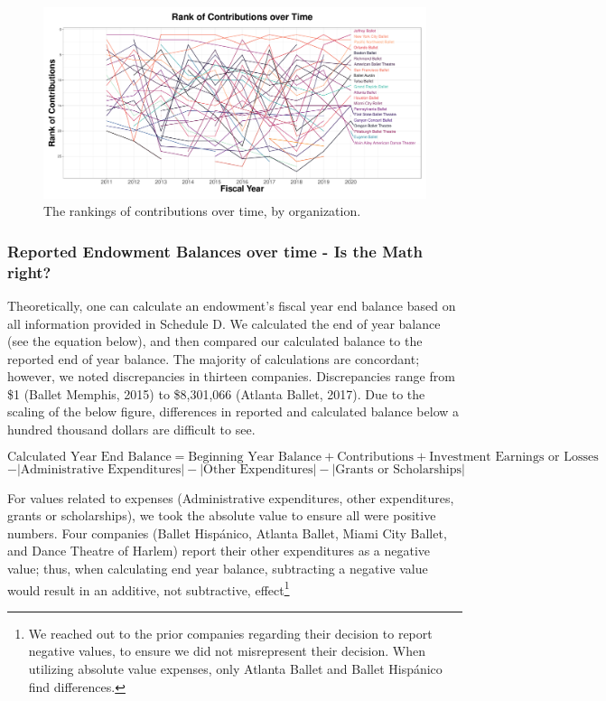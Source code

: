 \documentclass[Dance Data
Project,article,submit,moreauthors,pdftex]{mdpi}
\begin{document}
\begin{figure}[H]
\includegraphics[width=1\linewidth,]{../images/ranking-contributions} \caption{\label{fig:rankings-contributions}The rankings of contributions over time, by organization.}\label{fig:ranking-contributions}
\end{figure}

\hypertarget{reported-endowment-balances-over-time---is-the-math-right}{%
\subsubsection{Reported Endowment Balances over time - Is the Math
right?}\label{reported-endowment-balances-over-time---is-the-math-right}}

Theoretically, one can calculate an endowment's fiscal year end balance
based on all information provided in Schedule D. We calculated the end
of year balance (see the equation below), and then compared our
calculated balance to the reported end of year balance. The majority of
calculations are concordant; however, we noted discrepancies in thirteen
companies. Discrepancies range from \$1 (Ballet Memphis, 2015) to
\$8,301,066 (Atlanta Ballet, 2017). Due to the scaling of the below
figure, differences in reported and calculated balance below a hundred
thousand dollars are difficult to see.

\[\text{Calculated Year End Balance} = \text{Beginning Year Balance} + \text{Contributions} + \text{Investment Earnings or Losses}\]
\[- |\text{Administrative Expenditures}| - |\text{Other Expenditures}| - | \text{Grants or Scholarships}|\]

For values related to expenses (Administrative expenditures, other
expenditures, grants or scholarships), we took the absolute value to
ensure all were positive numbers. Four companies (Ballet Hispánico,
Atlanta Ballet, Miami City Ballet, and Dance Theatre of Harlem) report
their other expenditures as a negative value; thus, when calculating end
year balance, subtracting a negative value would result in an additive,
not subtractive, effect\footnote{We reached out to the prior companies
  regarding their decision to report negative values, to ensure we did
  not misrepresent their decision. When utilizing absolute value
  expenses, only Atlanta Ballet and Ballet Hispánico find differences.}
\end{document}
